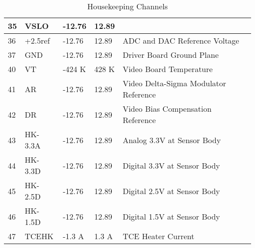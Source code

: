 \begin{table}[h]
\begin{tabular}{|l|l|l|l|l|}
35 & VSLO & -12.76 & 12.89&\\
\hline
36 & +2.5ref & -12.76 & 12.89& ADC and DAC Reference Voltage\\
\hline
37 & GND & -12.76 & 12.89& Driver Board Ground Plane\\
\hline
40 & VT & -424 K& 428 K & Video Board Temperature\\
\hline
41 & AR & -12.76 & 12.89& Video Delta-Sigma Modulator Reference\\
\hline
42 & DR &-12.76 & 12.89& Video Bias Compensation Reference\\
\hline
43 & HK-3.3A &-12.76 & 12.89& Analog 3.3V at Sensor Body\\
\hline
44 & HK-3.3D &-12.76 & 12.89& Digital 3.3V at Sensor Body\\
\hline
45 & HK-2.5D &-12.76 & 12.89& Digital 2.5V at Sensor Body\\
\hline
46 & HK-1.5D &-12.76 & 12.89& Digital 1.5V at Sensor Body\\
\hline
47 & TCEHK & -1.3 A& 1.3 A & TCE Heater Current\\
\hline
\end{tabular}
\caption{Housekeeping Channels}
\label{HKC}
\end{table}


